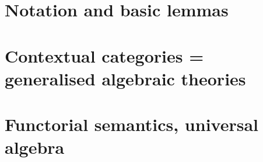 \lipsum[15]

\section{Notation and basic lemmas} \label{sec:source-2-3}

\lipsum[16]

\section{Contextual categories = generalised algebraic theories} \label{sec:source-2-4}

\lipsum[17]

\section{Functorial semantics, universal algebra} \label{sec:source-2-5}

\lipsum[18]

